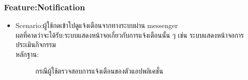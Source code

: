 \documentclass[14pt,oneside,openright,a4paper]{cpe-thai-project}
\begin{document}
\subsubsection{Feature:Notification}
\begin{itemize}
  \item Scenario:ผู้ใช้กดเข้าไปดูแจ้งเตือนจากทางระบบผ่าน messenger
  \\ผลที่คาดว่าจะได้รับ:ระบบแสดงหน้าจอเกี่ยวกับการแจ้งเตือนนั้น ๆ เช่น ระบบแสดงหน้าจอการประเมินกิจกรรม
  \\หลักฐาน:\\
  \begin{figure}[!h]\centering
    \setlength{\fboxrule}{0.5mm} %
    \setlength{\fboxsep}{0.5cm}
    \caption{กรณีผู้ใช้ตรวจสอบการแจ้งเตือนของตัวแอปพลิเคชั่น}\label{fig:NotificationTest}
  \end{figure}
\end{itemize}
\end{document}
